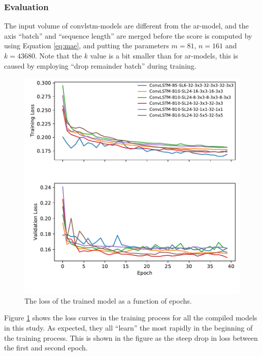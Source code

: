 \subsubsection{Evaluation}
The input volume of \acrshort{convlstm}-models are different from the \acrshort{ar}-model, and the axis ``batch'' and ``sequence length'' are merged before the score is computed by using Equation \eqref{eq:mae}, and putting the parameters $m = 81$, $n=161$ and $k=43680$. Note that the $k$ value is a bit smaller than for \acrshort{ar}-models, this is caused by employing ``drop remainder batch'' during training. 
\begin{figure}
    \centering
    \includegraphics{python_figs/epoch_vs_loss.pdf}
    \caption{The loss of the trained model as a function of epochs.}
    \label{fig:convlstm_loss}
\end{figure}
Figure \ref{fig:convlstm_loss} shows the loss curves in the training process for all the compiled models in this study. As expected, they all ``learn'' the most rapidly in the beginning of the training process. This is shown in the figure as the steep drop in loss between the first and second epoch. 

